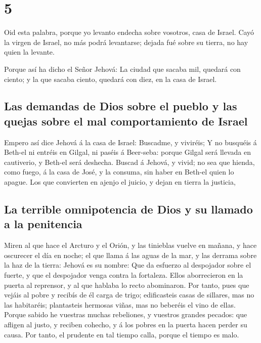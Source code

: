 \hypertarget{section-4}{%
\section{5}\label{section-4}}

 Oid esta palabra, porque yo levanto endecha sobre
vosotros, casa de Israel.  Cayó la virgen de Israel, no
más podrá levantarse; dejada fué sobre su tierra, no hay quien la
levante.

 Porque así ha dicho el Señor Jehová: La ciudad que sacaba
mil, quedará con ciento; y la que sacaba ciento, quedará con diez, en la
casa de Israel.

\hypertarget{las-demandas-de-dios-sobre-el-pueblo-y-las-quejas-sobre-el-mal-comportamiento-de-israel}{%
\subsection{Las demandas de Dios sobre el pueblo y las quejas sobre el
mal comportamiento de
Israel}\label{las-demandas-de-dios-sobre-el-pueblo-y-las-quejas-sobre-el-mal-comportamiento-de-israel}}

 Empero así dice Jehová á la casa de Israel: Buscadme, y
viviréis;  Y no busquéis á Beth-el ni entréis en Gilgal,
ni paséis á Beer-seba: porque Gilgal será llevada en cautiverio, y
Beth-el será deshecha.  Buscad á Jehová, y vivid; no sea
que hienda, como fuego, á la casa de José, y la consuma, sin haber en
Beth-el quien lo apague.  Los que convierten en ajenjo el
juicio, y dejan en tierra la justicia,

\hypertarget{la-terrible-omnipotencia-de-dios-y-su-llamado-a-la-penitencia}{%
\subsection{La terrible omnipotencia de Dios y su llamado a la
penitencia}\label{la-terrible-omnipotencia-de-dios-y-su-llamado-a-la-penitencia}}

 Miren al que hace el Arcturo y el Orión, y las tinieblas
vuelve en mañana, y hace oscurecer el día en noche; el que llama á las
aguas de la mar, y las derrama sobre la haz de la tierra: Jehová es su
nombre:  Que da esfuerzo al despojador sobre el fuerte, y
que el despojador venga contra la fortaleza.  Ellos
aborrecieron en la puerta al reprensor, y al que hablaba lo recto
abominaron.  Por tanto, pues que vejáis al pobre y
recibís de él carga de trigo; edificasteis casas de sillares, mas no las
habitaréis; plantasteis hermosas viñas, mas no beberéis el vino de
ellas.  Porque sabido he vuestras muchas rebeliones, y
vuestros grandes pecados: que afligen al justo, y reciben cohecho, y á
los pobres en la puerta hacen perder su causa.  Por
tanto, el prudente en tal tiempo calla, porque el tiempo es malo.


